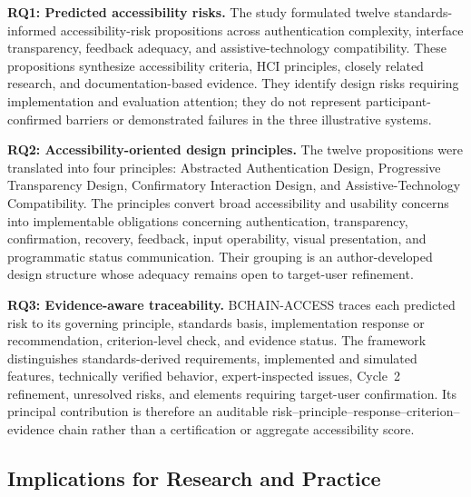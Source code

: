 \documentclass[journal]{IEEEtran}
\begin{document}
\noindent\textbf{RQ1: Predicted accessibility risks.}
The study formulated twelve standards-informed accessibility-risk propositions across authentication complexity, interface transparency, feedback adequacy, and assistive-technology compatibility. These propositions synthesize accessibility criteria, HCI principles, closely related research, and documentation-based evidence. They identify design risks requiring implementation and evaluation attention; they do not represent participant-confirmed barriers or demonstrated failures in the three illustrative systems.

\noindent\textbf{RQ2: Accessibility-oriented design principles.}
The twelve propositions were translated into four principles: Abstracted Authentication Design, Progressive Transparency Design, Confirmatory Interaction Design, and Assistive-Technology Compatibility. The principles convert broad accessibility and usability concerns into implementable obligations concerning authentication, transparency, confirmation, recovery, feedback, input operability, visual presentation, and programmatic status communication. Their grouping is an author-developed design structure whose adequacy remains open to target-user refinement.

\noindent\textbf{RQ3: Evidence-aware traceability.}
BCHAIN-ACCESS traces each predicted risk to its governing principle, standards basis, implementation response or recommendation, criterion-level check, and evidence status. The framework distinguishes standards-derived requirements, implemented and simulated features, technically verified behavior, expert-inspected issues, Cycle~2 refinement, unresolved risks, and elements requiring target-user confirmation. Its principal contribution is therefore an auditable risk--principle--response--criterion--evidence chain rather than a certification or aggregate accessibility score.

\subsection{Implications for Research and Practice}
\end{document}
